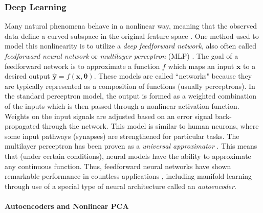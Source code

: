 \subsubsection{Deep Learning} \label{sec:Deep_Learning}
Many natural phenomena behave in a nonlinear way, meaning that the observed data define a curved subspace in the original feature space \citep{Scholz2008NonlinearPCA}.  One method used to model this nonlinearity is to utilize a \textit{deep feedforward network}, also often called \textit{feedforward neural network} or \textit{multilayer perceptron} (MLP) \citep{Goodfellow2016DeepLearning}.  The goal of a feedforward network is to approximate a function $f$ which maps an input $\bm{x}$ to a desired output $\hat{\bm{y}}=f(\bm{x}, \bm{\theta})$.  These models are called ``networks" because they are typically represented as a composition of functions (usually perceptrons). In the standard perceptron model, the output is formed as a weighted combination of the inputs which is then passed through a nonlinear activation function.  Weights on the input signals are adjusted based on an error signal back-propagated through the network.  This model is similar to human neurons, where some input pathways (synapses) are strengthened for particular tasks.  The multilayer perceptron has been proven as a \textit{universal approximator} \citep{Haykin2009NeuralNetworks, Principe1999NeuralAdaptiveSystems}.  This means that (under certain conditions), neural models have the ability to approximate any continuous function.  Thus, feedforward neural networks have shown remarkable performance in countless applications \citep{Liu2017DeepLearningSurvey, Dhillon2019CNNSurvey, Abiodun2018DeepLearningSurvey, Shadid2019DeepLearningHealthCare, Alom2019DeepLearningSurvey, Tschannen2018RecentAdvancesAutoencoder, Yuan2019AutoencoderSurvey, Chen2019DeepAutoencoders}, including manifold learning through use of a special type of neural architecture called an \textit{autoencoder}.

\paragraph{Autoencoders and Nonlinear PCA} \label{sec:Autoencoders}

